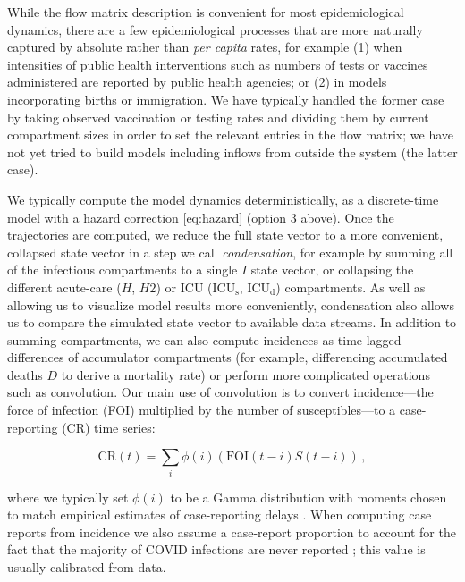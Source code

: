 \documentclass[12pt]{article}\usepackage[]{graphicx}\usepackage[]{color}
\begin{document}
While the flow matrix description is convenient for most epidemiological dynamics, there are a few epidemiological processes that are more naturally captured by absolute rather than \emph{per capita} rates, for example (1) when intensities of public health interventions such as numbers of tests or vaccines administered are reported by public health agencies; or (2) in models incorporating births or immigration.
We have typically handled the former case by taking observed vaccination or testing rates and dividing them by current compartment sizes in order to set the relevant entries in the flow matrix; we have not yet tried to build models including inflows from outside the system (the latter case).

We typically compute the model dynamics deterministically, as a discrete-time model with a hazard correction \eqref{eq:hazard} (option 3 above).  Once the trajectories are computed, we reduce the full state vector to a more convenient, collapsed state vector in a step we call \emph{condensation}, for example by summing all of the infectious compartments to a single $I$ state vector, or collapsing the different acute-care ($H$, $H2$) or ICU ($\textrm{ICU}_\textrm{s}$, $\textrm{ICU}_\textrm{d}$)
compartments.
As well as allowing us to visualize model results more conveniently, condensation also allows us to compare the simulated state vector to available data streams.
In addition to summing compartments, we can also compute incidences as time-lagged differences of accumulator compartments (for example, differencing accumulated deaths $D$ to derive a mortality rate) or perform more complicated operations such as convolution. 
Our main use of convolution is to convert incidence---the force of infection (FOI) multiplied by the number of susceptibles---to a case-reporting (CR) time series: 
\begin{linenomath*}
\begin{equation}\label{eq:CR}
\textrm{CR}(t) = \sum_i \phi(i) (\textrm{FOI}(t-i) S(t-i))\,,
\end{equation}
\end{linenomath*}
where we typically set $\phi(i)$ to be a Gamma distribution with
moments chosen to match empirical estimates of case-reporting delays
.
When computing case reports from incidence we also assume a case-report proportion  to account for the fact that the majority of COVID infections are never reported \cite{Doug+2020}; this value is usually calibrated from data.
\end{document}
